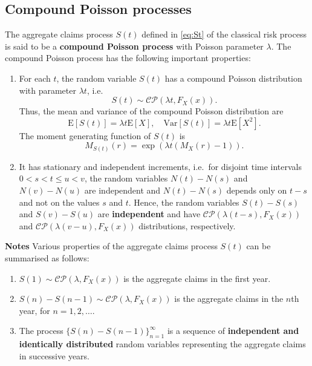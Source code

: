 \documentclass[landscape, 20pt]{extreport}
\theoremstyle{definition}
\theoremstyle{definition}
\theoremstyle{definition}
\theoremstyle{definition}
\theoremstyle{remark}
\begin{document}
\hypertarget{compound-poisson-processes}{%
\subsection{Compound Poisson processes}\label{compound-poisson-processes}}

The aggregate claims process \(S(t)\) defined in \eqref{eq:St}
of the classical
risk process is said to be a \textbf{compound Poisson process} with Poisson
parameter \(\lambda\). The compound Poisson process has the following
important properties:

\begin{enumerate}
\def\labelenumi{\arabic{enumi}.}
\item
  For each \(t\), the random variable \(S(t)\) has a compound Poisson
  distribution with parameter \(\lambda t\), i.e.
  \[S(t) \sim \mathcal{CP}(\lambda t, F_X(x)).\] Thus, the mean and
  variance of the compound Poisson distribution are
  \[\mathrm{E}[S(t)] = \lambda t \mathrm{E}[X], \quad \mathrm{Var}[S(t)] =\lambda t \mathrm{E}[X^2].\]
  The moment generating function of \(S(t)\) is
  \[M_{S(t)}(r) = \exp(\lambda t(M_X(r) - 1)).\]
\item
  It has stationary and independent increments, i.e.~for disjoint time
  intervals \(0 < s < t \le u < v\), the random variables \(N(t) - N(s)\)
  and \(N(v) - N(u)\) are independent and \(N(t) - N(s)\) depends only on \(t -s\) and not on the values \(s\) and \(t\). Hence, the random variables \(S(t) - S(s)\) and \(S(v) - S(u)\)
  are \textbf{independent} and have
  \(\mathcal{CP}(\lambda (t -s), F_X(x))\) and
  \(\mathcal{CP}(\lambda (v - u), F_X(x))\) distributions, respectively.
\end{enumerate}

\textbf{Notes} Various properties of the aggregate claims process \(S(t)\) can
be summarised as follows:

\begin{enumerate}
\def\labelenumi{\arabic{enumi}.}
\item
  \(S(1) \sim \mathcal{CP}(\lambda, F_X(x))\) is the aggregate claims in
  the first year.
\item
  \(S(n) - S(n-1) \sim \mathcal{CP}(\lambda, F_X(x))\) is the aggregate
  claims in the \(n\)th year, for \(n = 1,2, \ldots\).
\item
  The process \(\{ S(n) - S(n-1) \}_{n=1}^\infty\) is a sequence of
  \textbf{independent and identically distributed} random variables
  representing the aggregate claims in successive years.
\end{enumerate}
\end{document}
